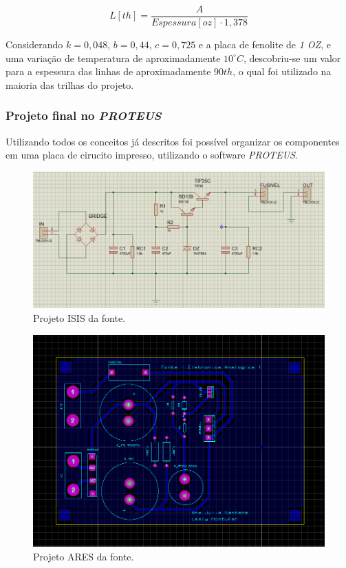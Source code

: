 \documentclass[a4paper,12pt,oneside,openany,table,xcdraw]{article}
\begin{document}
\begin{equation}
L [\mathit{th}] = \dfrac{A}{Espessura [oz] \cdot 1,378}
 \end{equation}
\vspace{0.3cm}

Considerando  $k = 0,048$, $b = 0,44$, $c = 0,725$ e a placa de fenolite de \emph{1 OZ}, e uma variação de temperatura de aproximadamente $10^{\circ}C$, descobriu-se um valor para a espessura das linhas de aproximadamente $90 th$, o qual foi utilizado na maioria das trilhas do projeto.

\vspace{0.2cm}
\subsubsection{Projeto final no \emph{PROTEUS}}
Utilizando todos os conceitos já descritos foi possível organizar os componentes em uma placa de cirucito impresso, utilizando o software \emph{PROTEUS}.
\begin{figure}[H]
\centering
  
\includegraphics[width=15cm]{isis}
\caption{Projeto ISIS da fonte.}
\label{isis}
\end{figure}

\begin{figure}[H]
\centering
\includegraphics[width=15cm]{ares}
\caption{Projeto ARES da fonte.}
\label{ares}
\end{figure}
\end{document}
